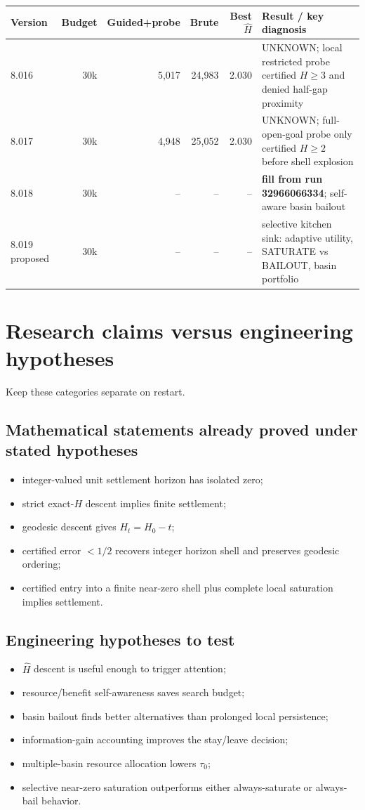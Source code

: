 \documentclass[11pt]{article}
\begin{document}
\begin{center}
\begin{tabularx}{\textwidth}{lrrrrX}
\toprule
Version & Budget & Guided+probe & Brute & Best $\widehat H$ & Result / key diagnosis \\
\midrule
8.016 & 30k & 5,017 & 24,983 & 2.030 & UNKNOWN; local restricted probe certified $H\ge3$ and denied half-gap proximity \\
8.017 & 30k & 4,948 & 25,052 & 2.030 & UNKNOWN; full-open-goal probe only certified $H\ge2$ before shell explosion \\
8.018 & 30k & -- & -- & -- & \textbf{fill from run 32966066334}; self-aware basin bailout \\
8.019 proposed & 30k & -- & -- & -- & selective kitchen sink: adaptive utility, SATURATE vs BAILOUT, basin portfolio \\
\bottomrule
\end{tabularx}
\end{center}

\section{Research claims versus engineering hypotheses}

Keep these categories separate on restart.

\subsection*{Mathematical statements already proved under stated hypotheses}
\begin{itemize}
\item integer-valued unit settlement horizon has isolated zero;
\item strict exact-$H$ descent implies finite settlement;
\item geodesic descent gives $H_t=H_0-t$;
\item certified error $<1/2$ recovers integer horizon shell and preserves geodesic ordering;
\item certified entry into a finite near-zero shell plus complete local saturation implies settlement.
\end{itemize}

\subsection*{Engineering hypotheses to test}
\begin{itemize}
\item $\widehat H$ descent is useful enough to trigger attention;
\item resource/benefit self-awareness saves search budget;
\item basin bailout finds better alternatives than prolonged local persistence;
\item information-gain accounting improves the stay/leave decision;
\item multiple-basin resource allocation lowers $\tau_0$;
\item selective near-zero saturation outperforms either always-saturate or always-bail behavior.
\end{itemize}
\end{document}

